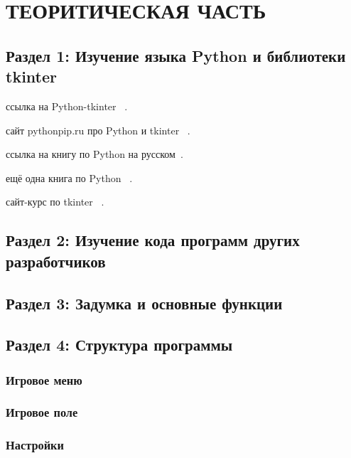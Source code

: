 \chapter{\label{ch:ch01}ТЕОРИТИЧЕСКАЯ ЧАСТЬ} %

\section{\label{sec:ch01/sec01}Раздел 1: Изучение языка Python и библиотеки tkinter}

ссылка на Python-tkinter ~\cite{Python-tkinter}.

сайт pythonpip.ru про Python и tkinter ~\cite{Python-tkinter_2}.

ссылка на книгу по Python на русском~\cite{book_Python}.

ещё одна книга по Python ~\cite{book_Python_2}.

сайт-курс по tkinter ~\cite{Course-tkinter}.

\section{\label{sec:ch01/sec02}Раздел 2: Изучение кода программ других разработчиков}

\section{\label{sec:ch01/sec03}Раздел 3: Задумка и основные функции}

\section{\label{sec:ch01/sec03}Раздел 4: Структура программы}

\subsection{\label{sec:ch01/sec04}Игровое меню}
\subsection{\label{sec:ch01/sec04}Игровое поле}
\subsection{\label{sec:ch01/sec04}Настройки}
